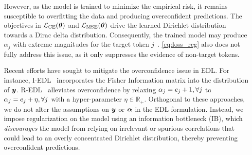 However, as the model is trained to minimize the empirical risk, it remains susceptible to overfitting the data and producing overconfident predictions. The objectives in $\mathcal{L}_{\text{CE}}(\bm{\theta})$ and $\mathcal{L}_{\text{MSE}}(\bm{\theta})$ drive the learned Dirichlet distribution towards a Dirac delta distribution. Consequently, the trained model may produce $\alpha_j$ with extreme magnitudes for the target token $j$~\citep{chen2024redl}. \cref{eq:loss_reg} also does not fully address this issue, as it only suppresses the evidence of non-target tokens. 

Recent efforts have sought to mitigate the overconfidence issue in EDL. For instance, I-EDL~\citep{deng2023uncertainty} incorporates the Fisher Information matrix into the distribution of $\bm{y}$. R-EDL~\citep{chen2024redl} alleviates overconfidence by relaxing $\alpha_j = e_j + 1, \forall j$ to $\alpha_j = e_j + \eta, \forall j$ with a hyper-parameter $\eta \in \mathbb{R}_+$. Orthogonal to these approaches, we do not alter the assumptions on $\bm{y}$ or $\bm{\alpha}$ in the EDL formulation. Instead, we impose regularization on the model using an information bottleneck (IB), which \emph{discourages} the model from relying on irrelevant or spurious correlations that could lead to an overly concentrated Dirichlet distribution, thereby preventing overconfident predictions.


